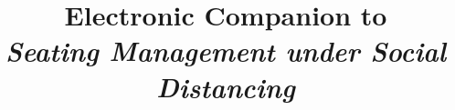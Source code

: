 \documentclass{article}
\theoremstyle{ecompanion}
\begin{document}
\title{Electronic Companion to \\ \textit{Seating Management under Social Distancing}}
\author{}
\date{}
\maketitle












\printbibliography[title={References in E-Companion}]
\end{document}
